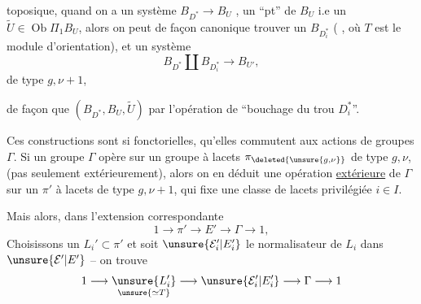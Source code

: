   toposique, quand on a un système \(B_{D^*}\longrightarrow B_U\) , un ``pt'' de \(B_U\) i.e un \(\widetilde U\in\operatorname{Ob}\Pi_1B_U\), alors on peut de façon canonique trouver un \(B_{D_i^*}\) ( , où \(T\) est le module d'orientation), et un système
\[
B_{D^*}\amalg B_{D_i^*}\longrightarrow B_{U'},
\]
de type \(g,\nu+1\),


de façon que \((B_{D^*},B_U,\widetilde U)\)  par l'opération de ``bouchage du trou \(D_i^*\)''.

Ces constructions sont si fonctorielles, \margin{\unsure{\(\wedge\)}} qu'elles commutent aux actions de groupes \(\Gamma\). Si un groupe \(\Gamma\) opère sur un groupe à lacets \(\pi_{\deleted{\unsure{g,\nu}}}\) de type \(g,\nu\), (pas seulement extérieurement), alors on en déduit une opération \uline{extérieure} de \(\Gamma\) sur un \(\pi'\) à lacets de type \(g,\nu+1\), qui fixe une classe de lacets privilégiée \(i\in I\).

Mais alors, dans l'extension correspondante
\[
1\longrightarrow\pi'\longrightarrow E'\longrightarrow\Gamma\longrightarrow1,
\]
Choisissons un \(L_i'\subset\pi'\) et soit \(\unsure{\mathcal E_i'|E_i'}\) le normalisateur de \(L_i\) dans \(\unsure{\mathcal E'|E'}\) -- on trouve
\[
1\longrightarrow
\underset{\unsure{\simeq T}}{\unsure{L_i'}}
\longrightarrow\unsure{\mathcal E_i'|E_i'}
\longrightarrow\Gamma\longrightarrow1
\]
